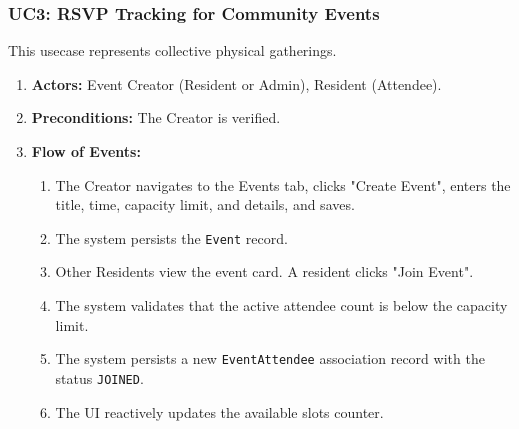 \subsubsection{UC3: RSVP Tracking for Community Events}
This usecase represents collective physical gatherings.
\begin{enumerate}
    \item \textbf{Actors:} Event Creator (Resident or Admin), Resident (Attendee).
    \item \textbf{Preconditions:} The Creator is verified.
    \item \textbf{Flow of Events:}
    \begin{enumerate}
        \item The Creator navigates to the Events tab, clicks "Create Event", enters the title, time, capacity limit, and details, and saves.
        \item The system persists the \texttt{Event} record.
        \item Other Residents view the event card. A resident clicks "Join Event".
        \item The system validates that the active attendee count is below the capacity limit.
        \item The system persists a new \texttt{EventAttendee} association record with the status \texttt{JOINED}.
        \item The UI reactively updates the available slots counter.
    \end{enumerate}
\end{enumerate}

